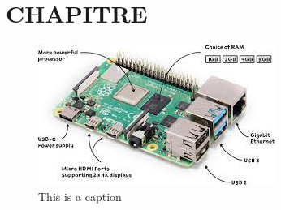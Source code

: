 \section{CHAPITRE }
\begin{figure}[h]
	\centering
	\includegraphics{chapitres/images/raspberry.jpg}
	\caption{This is a caption}
	\label{fig:labelname}
\end{figure}



